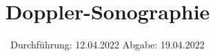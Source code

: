 

\subject{US3}
\title{Doppler-Sonographie}
\date{%
  Durchführung: 12.04.2022
  \hspace{3em}
  Abgabe: 19.04.2022
}



\maketitle
\thispagestyle{empty}
\tableofcontents
\newpage






\printbibliography{}





